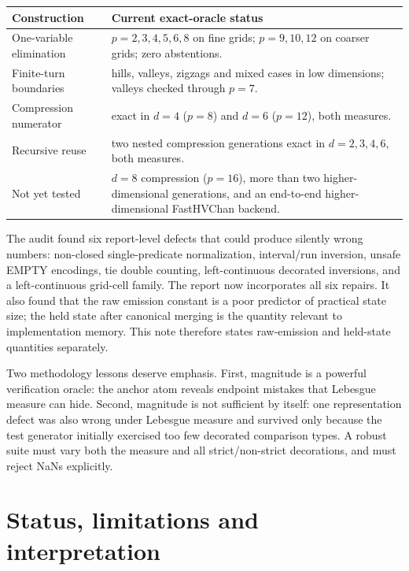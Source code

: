 \documentclass[12pt,a4paper]{article}
\theoremstyle{definition}
\newcommand{\1}{\mathbf 1}
\begin{document}
\begin{center}
\begin{tabular}{>{\raggedright\arraybackslash}p{} >{\raggedright\arraybackslash}p{}}
\toprule
Construction & Current exact-oracle status \\
\midrule
One-variable elimination & $p=2,3,4,5,6,8$ on fine grids; $p=9,10,12$ on coarser grids; zero abstentions. \\
Finite-turn boundaries & hills, valleys, zigzags and mixed cases in low dimensions; valleys checked through $p=7$. \\
Compression numerator & exact in $d=4$ ($p=8$) and $d=6$ ($p=12$), both measures. \\
Recursive reuse & two nested compression generations exact in $d=2,3,4,6$, both measures. \\
Not yet tested & $d=8$ compression ($p=16$), more than two higher-dimensional generations, and an end-to-end higher-dimensional FastHVChan backend. \\
\bottomrule
\end{tabular}
\end{center}

The audit found six report-level defects that could produce silently wrong numbers: non-closed single-predicate normalization, interval/run inversion, unsafe EMPTY encodings, tie double counting, left-continuous decorated inversions, and a left-continuous grid-cell family. The report now incorporates all six repairs. It also found that the raw emission constant is a poor predictor of practical state size; the held state after canonical merging is the quantity relevant to implementation memory. This note therefore states raw-emission and held-state quantities separately.

Two methodology lessons deserve emphasis. First, magnitude is a powerful verification oracle: the anchor atom reveals endpoint mistakes that Lebesgue measure can hide. Second, magnitude is not sufficient by itself: one representation defect was also wrong under Lebesgue measure and survived only because the test generator initially exercised too few decorated comparison types. A robust suite must vary both the measure and all strict/non-strict decorations, and must reject NaNs explicitly.

\section{Status, limitations and interpretation}
\end{document}
